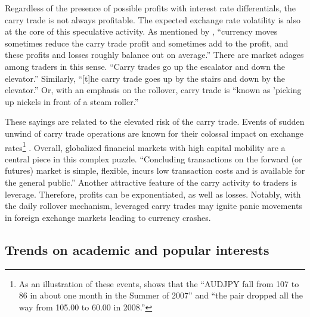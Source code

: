 \documentclass[a4paper, twoside]{templates/ociamthesis}
\begin{document}
Regardless of the presence of possible profits with interest rate differentials, the carry trade is not always profitable. The expected exchange rate volatility is also at the core of this speculative activity. As mentioned by \textcite[ 185]{pedersen2015}, ``currency moves sometimes reduce the carry trade profit and sometimes add to the profit, and these profits and losses roughly balance out on average.'' There are market adages among traders in this sense. ``Carry trades go up the escalator and down the elevator.'' \autocite[ 43]{donnelly2019} Similarly, ``{[}t{]}he carry trade goes up by the stairs and down by the elevator.'' \autocite[ 185]{pedersen2015} Or, with an emphasis on the rollover, carry trade is ``known as 'picking up nickels in front of a steam roller.'' \autocite[ 43]{donnelly2019}

These sayings are related to the elevated risk of the carry trade. Events of sudden unwind of carry trade operations are known for their colossal impact on exchange rates\footnote{As an illustration of these events, \textcite[ 43]{donnelly2019} shows that the ``AUDJPY fall from 107 to 86 in about one month in the Summer of 2007'' and ``the pair dropped all the way from 105.00 to 60.00 in 2008.''} \autocite[i.e., currency crash, as developed by][]{brunnermeier2008}. Overall, globalized financial markets with high capital mobility are a central piece in this complex puzzle. ``Concluding transactions on the forward (or futures) market is simple, flexible, incurs low transaction costs and is available for the general public.'' \autocite[ 945]{darvas2009} Another attractive feature of the carry activity to traders is leverage. Therefore, profits can be exponentiated, as well as losses. Notably, with the daily rollover mechanism, leveraged carry trades may ignite panic movements in foreign exchange markets leading to currency crashes.

\hypertarget{twothreetwo}{%
\subsection{Trends on academic and popular interests}\label{twothreetwo}}
\end{document}
